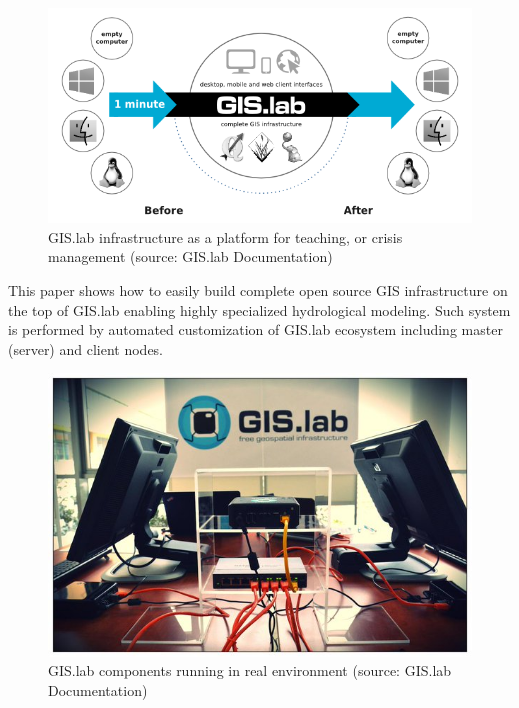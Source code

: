 \documentclass{isprs}
\begin{document}
\begin{figure}[ht!]
\begin{center}
  \includegraphics[width=1.0\columnwidth]{figures/gislab-architecture.png}
  \caption{GIS.lab infrastructure as a platform for teaching, or
    crisis management (source: GIS.lab Documentation)}
\label{fig:gislab_infrastructure}
\end{center}
\end{figure}

This paper shows how to easily build complete open source GIS
infrastructure on the top of GIS.lab enabling highly specialized
hydrological modeling. Such system is performed by automated
customization of GIS.lab ecosystem including master (server) and
client nodes.

\begin{figure}[ht!]
\begin{center}
  \includegraphics[width=0.9\columnwidth]{figures/gislab-real.jpg}
  \caption{GIS.lab components running in real environment (source:
    GIS.lab Documentation)}
\label{fig:gislab_infrastructure}
\end{center}
\end{figure}
\end{document}

